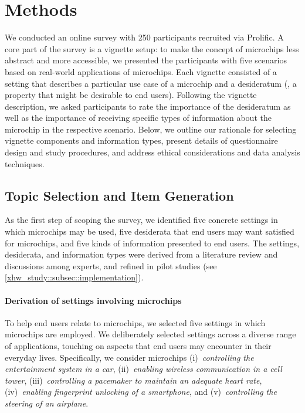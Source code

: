 \section{Methods}
\label{xhw_study::sec::methods}
We conducted an online survey with 250 participants recruited via Prolific. 
A core part of the survey is a vignette setup: to make the concept of microchips less abstract and more accessible, we presented the participants with five scenarios based on real-world applications of microchips.
Each vignette consisted of a setting that describes a particular use case of a microchip and a desideratum (\ie, a property that might be desirable to end users).
Following the vignette description, we asked participants to rate the importance of the desideratum as well as the importance of receiving specific types of information about the microchip in the respective scenario.
Below, we outline our rationale for selecting vignette components and information types, present details of questionnaire design and study procedures, and address ethical considerations and data analysis techniques.

\subsection{Topic Selection and Item Generation}
\label{xhw_study::subsec::topic}
As the first step of scoping the survey, we identified five concrete settings in which microchips may be used, five desiderata that end users may want satisfied for microchips, and five kinds of information presented to end users.
The settings, desiderata, and information types were derived
from a literature review and discussions among experts, and refined in pilot studies (see \autoref{xhw_study::subsec::implementation}).

\paragraph{Derivation of settings involving microchips}
To help end users relate to microchips, we selected five settings in which microchips are employed.
We deliberately selected settings across a diverse range of applications, touching on aspects that end users may encounter in their everyday lives.
Specifically, we consider microchips (i)~\textit{controlling the entertainment system in a car}, (ii)~\textit{enabling wireless communication in a cell tower}, (iii)~\textit{controlling a pacemaker to maintain an adequate heart rate}, (iv)~\textit{enabling fingerprint unlocking of a smartphone}, and (v)~\textit{controlling the steering of an airplane}.

